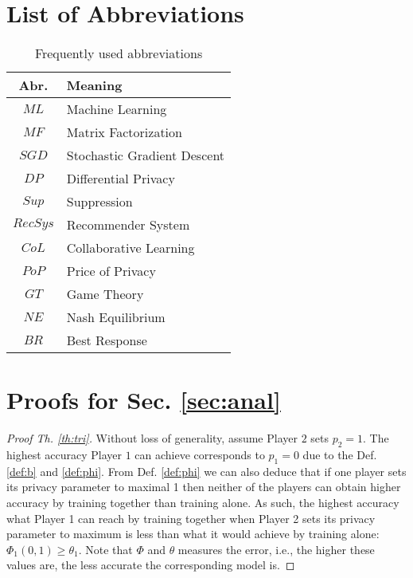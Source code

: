 \documentclass[USenglish,oneside,twocolumn]{article}
\theoremstyle{plain}
\begin{document}
    \newpage
    
	\begin{appendices}
        \section{List of Abbreviations}
        \label{app:abr}
        
        \begin{table}[h]
            \centering
            \begin{tabular}{|c|l|}
                \hline
                \bf{Abr.} & \bf{Meaning}\\
                \hline
                \hline
                $ML$ & Machine Learning\\
                \hline
                $MF$ & Matrix Factorization\\
                \hline
                $SGD$ & Stochastic Gradient Descent\\
                \hline
                $DP$ & Differential Privacy\\
                \hline
                $Sup$ & Suppression\\
                \hline
                $RecSys$ & Recommender System\\
                \hline
                $CoL$ & Collaborative Learning\\
                \hline
                $PoP$ & Price of Privacy\\
                \hline
                $GT$ & Game Theory\\
                \hline
                $NE$ & Nash Equilibrium\\
                \hline
                $BR$ & Best Response\\
                \hline
            \end{tabular}
            \vspace{0.1cm}
            \caption{Frequently used abbreviations}
        \end{table}
        
        \section{Proofs for Sec. \ref{sec:anal}}
        \label{app:proofs}
        
        \begin{proof}[Proof Th. \ref{th:tri}]
            Without loss of generality, assume Player $2$ sets $p_2=1$. The highest accuracy Player $1$ can achieve corresponds to $p_1=0$ due to the Def. \ref{def:b} and \ref{def:phi}. From Def. \ref{def:phi} we can also deduce that if one player sets its privacy parameter to maximal 1 then neither of the players can obtain higher accuracy by training together than training alone. As such, the highest accuracy what Player 1 can reach by training together when Player 2 sets its privacy parameter to maximum is less than what it would achieve by training alone: $\Phi_1(0,1)\geq\theta_1$. Note that $\Phi$ and $\theta$ measures the error, i.e., the higher these values are, the less accurate the corresponding model is.
            

\end{proof}
\end{appendices}
\end{document}
